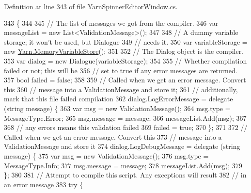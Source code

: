 Definition at line 343 of file Yarn\-Spinner\-Editor\-Window.\-cs.


\begin{DoxyCode}
343                                                                                                            
                        \{
344 
345             \textcolor{comment}{// The list of messages we got from the compiler.}
346             var messageList = \textcolor{keyword}{new} List<ValidationMessage>();
347 
348             \textcolor{comment}{// A dummy variable storage; it won't be used, but Dialogue}
349             \textcolor{comment}{// needs it.}
350             var variableStorage = \textcolor{keyword}{new} \hyperlink{a00130}{Yarn.MemoryVariableStore}();
351 
352             \textcolor{comment}{// The Dialog object is the compiler.}
353             var dialog = \textcolor{keyword}{new} Dialogue(variableStorage);
354 
355             \textcolor{comment}{// Whether compilation failed or not; this will be}
356             \textcolor{comment}{// set to true if any error messages are returned.}
357             \textcolor{keywordtype}{bool} failed = \textcolor{keyword}{false};
358 
359             \textcolor{comment}{// Called when we get an error message. Convert this}
360             \textcolor{comment}{// message into a ValidationMessage and store it;}
361             \textcolor{comment}{// additionally, mark that this file failed compilation}
362             dialog.LogErrorMessage = delegate (\textcolor{keywordtype}{string} message) \{
363                 var msg = \textcolor{keyword}{new} ValidationMessage();
364                 msg.type = MessageType.Error;
365                 msg.message = message;
366                 messageList.Add(msg);
367 
368                 \textcolor{comment}{// any errors means this validation failed}
369                 failed = \textcolor{keyword}{true};
370             \};
371 
372             \textcolor{comment}{// Called when we get an error message. Convert this}
373             \textcolor{comment}{// message into a ValidationMessage and store it}
374             dialog.LogDebugMessage = delegate (\textcolor{keywordtype}{string} message) \{
375                 var msg = \textcolor{keyword}{new} ValidationMessage();
376                 msg.type = MessageType.Info;
377                 msg.message = message;
378                 messageList.Add(msg);
379             \};
380 
381             \textcolor{comment}{// Attempt to compile this script. Any exceptions will result}
382             \textcolor{comment}{// in an error message}
383             \textcolor{keywordflow}{try} \{

\end{DoxyCode}
